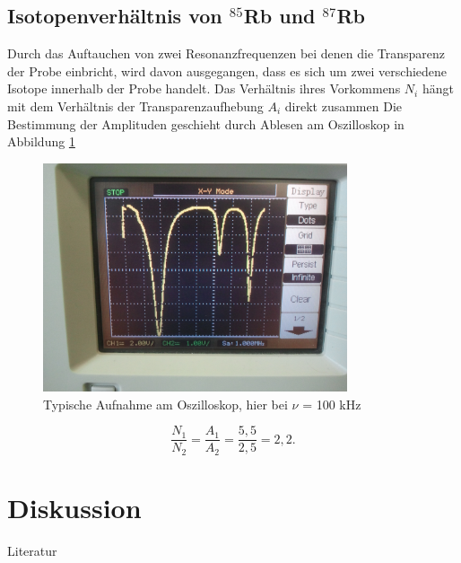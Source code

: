 \subsection{Isotopenverhältnis von $^{85}$Rb und $^{87}$Rb}
Durch das Auftauchen von zwei Resonanzfrequenzen bei denen die Transparenz der Probe einbricht, wird davon ausgegangen, dass es sich um zwei verschiedene
Isotope innerhalb der Probe handelt. Das Verhältnis ihres Vorkommens $N_i$ hängt mit dem Verhältnis der Transparenzaufhebung $A_i$ direkt zusammen
Die Bestimmung der Amplituden geschieht durch Ablesen am Oszilloskop in Abbildung \ref{pic_verh}
\begin{figure}[h]
\includegraphics[width=0.8\textwidth]{pics/v21Verh.jpg}
\caption{Typische Aufnahme am Oszilloskop, hier bei $\nu$ = 100 kHz}
\label{pic_verh}
\end{figure}\begin{equation}
 \frac{N_1}{N_2} = \frac{A_1}{A_2} = \frac{5,5}{2,5}= 2,2.
\end{equation}


\section{Diskussion}





\parskip 340pt
\Large{Literatur}\\\\





